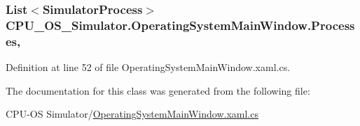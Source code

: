 \hypertarget{class_c_p_u___o_s___simulator_1_1_operating_system_main_window_aadbbb1f580d767211e180a95ec71b849}{}
\subsubsection[{Processes}]{\setlength{\rightskip}{0pt plus 5cm}List$<${\bf Simulator\+Process}$>$ C\+P\+U\+\_\+\+O\+S\+\_\+\+Simulator.\+Operating\+System\+Main\+Window.\+Processes\hspace{0.3cm}{\ttfamily [get]}, {\ttfamily [set]}}\label{class_c_p_u___o_s___simulator_1_1_operating_system_main_window_aadbbb1f580d767211e180a95ec71b849}


Definition at line 52 of file Operating\+System\+Main\+Window.\+xaml.\+cs.



The documentation for this class was generated from the following file\+:\begin{DoxyCompactItemize}
\item 
C\+P\+U-\/\+O\+S Simulator/\hyperlink{_operating_system_main_window_8xaml_8cs}{Operating\+System\+Main\+Window.\+xaml.\+cs}\end{DoxyCompactItemize}
